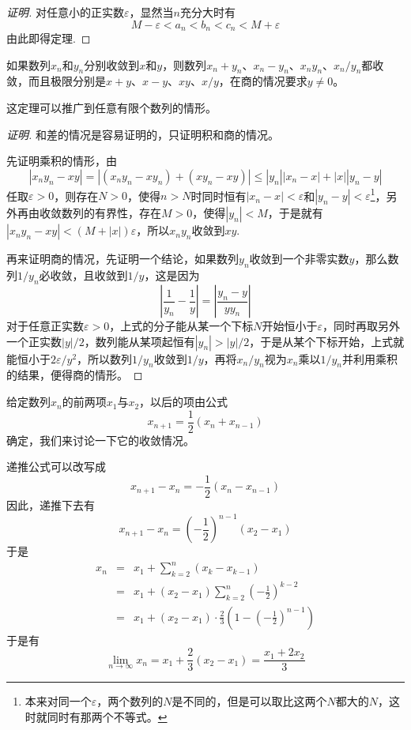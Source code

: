\begin{proof}[证明]
  对任意小的正实数$\varepsilon$，显然当$n$充分大时有
  \[ M-\varepsilon < a_n < b_n < c_n < M+\varepsilon \]
  由此即得定理.
\end{proof}

\begin{theorem}
  如果数列$x_n$和$y_n$分别收敛到$x$和$y$，则数列$x_n+y_n$、$x_n-y_n$、$x_ny_n$、$x_n/y_n$都收敛，而且极限分别是$x+y$、$x-y$、$xy$、$x/y$，在商的情况要求$y \neq 0$。
\end{theorem}

这定理可以推广到任意有限个数列的情形。

\begin{proof}[证明]
  和差的情况是容易证明的，只证明积和商的情况。

  先证明乘积的情形，由
  \begin{equation*}
    |x_ny_n-xy| = |(x_ny_n-xy_n) + (xy_n-xy)| \leqslant |y_n||x_n-x| + |x| |y_n-y|
  \end{equation*}
  任取$\varepsilon > 0$，则存在$N>0$，使得$n>N$时同时恒有$|x_n-x|<\varepsilon$和$|y_n-y|<\varepsilon$\footnote{本来对同一个$\varepsilon$，两个数列的$N$是不同的，但是可以取比这两个$N$都大的$N$，这时就同时有那两个不等式。}，另外再由收敛数列的有界性，存在$M>0$，使得$ |y_n| < M$，于是就有 $|x_ny_n-xy| < (M+|x|)\varepsilon$，所以$x_ny_n$收敛到$xy.$

  再来证明商的情况，先证明一个结论，如果数列$y_n$收敛到一个非零实数$y$，那么数列$1/y_n$必收敛，且收敛到$1/y$，这是因为
  \begin{equation*}
    \left| \frac{1}{y_n} - \frac{1}{y} \right| = \left| \frac{y_n-y}{yy_n} \right|
  \end{equation*}
  对于任意正实数$\varepsilon>0$，上式的分子能从某一个下标$N$开始恒小于$\varepsilon$，同时再取另外一个正实数$|y|/2$，数列能从某项起恒有$|y_n|>|y|/2$，于是从某个下标开始，上式就能恒小于$2\varepsilon / y^2$，所以数列$1/y_n$收敛到$1/y$，再将$x_n/y_n$视为$x_n$乘以$1/y_n$并利用乘积的结果，便得商的情形。
\end{proof}


\begin{example}
  给定数列$x_n$的前两项$x_1$与$x_2$，以后的项由公式
  \[ x_{n+1}=\frac{1}{2}(x_n+x_{n-1}) \]
  确定，我们来讨论一下它的收敛情况。

  递推公式可以改写成
  \[ x_{n+1}-x_n = -\frac{1}{2}(x_n-x_{n-1}) \]
  因此，递推下去有
  \[ x_{n+1}-x_n = \left( -\frac{1}{2} \right)^{n-1}(x_2-x_1) \]
  于是
  \begin{eqnarray*}
    x_n & = & x_1 + \sum_{k=2}^n(x_k-x_{k-1})  \\
        & = & x_1 + (x_2-x_1)\sum_{k=2}^n \left( -\frac{1}{2} \right)^{k-2} \\
    & = & x_1 + (x_2-x_1) \cdot \frac{2}{3}\left( 1- \left( - \frac{1}{2} \right)^{n-1} \right)
  \end{eqnarray*}
  于是有
  \[ \lim_{n \to \infty} x_n = x_1 + \frac{2}{3}(x_2-x_1) = \frac{x_1+2x_2}{3} \]
\end{example}

